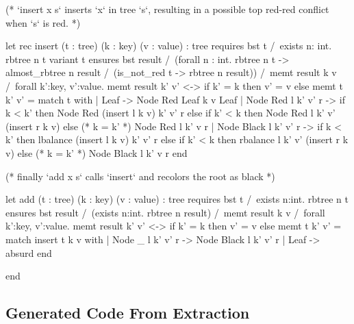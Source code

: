 \begin{whylang}
  (* `insert x s` inserts `x` in tree `s`, resulting in a possible top red-red
     conflict when `s` is red. *)

  let rec insert (t : tree) (k : key) (v : value) : tree
    requires { bst t /\ exists n: int. rbtree n t }
    variant { t }
    ensures { bst result /\
      (forall n : int. rbtree n t -> almost_rbtree n result /\
         (is_not_red t -> rbtree n result)) /\
      memt result k v /\
      forall k':key, v':value.
      memt result k' v' <-> if k' = k then v' = v else memt t k' v' }
  = match t with
    | Leaf ->
        Node Red Leaf k v Leaf
    | Node Red l k' v' r ->
        if k < k' then Node Red (insert l k v) k' v' r
        else if k' < k then Node Red l k' v' (insert r k v)
        else (* k = k' *) Node Red l k' v r
    | Node Black l k' v' r ->
        if k < k' then lbalance (insert l k v) k' v' r
        else if k' < k then rbalance l k' v' (insert r k v)
        else (* k = k' *) Node Black l k' v r
    end

  (* finally `add x s` calls `insert` and recolors the root as black *)

  let add (t : tree) (k : key) (v : value) : tree
    requires { bst t /\ exists n:int. rbtree n t }
    ensures { bst result /\ (exists n:int. rbtree n result) /\
      memt result k v /\
      forall k':key, v':value.
      memt result k' v' <-> if k' = k then v' = v else memt t k' v' }
  = match insert t k v with
    | Node _ l k' v' r -> Node Black l k' v' r
    | Leaf -> absurd
    end

end
\end{whylang}

\subsection{Generated \cml Code From Extraction}
\label{subsec:Red_Black_Trees_Cakeml}


